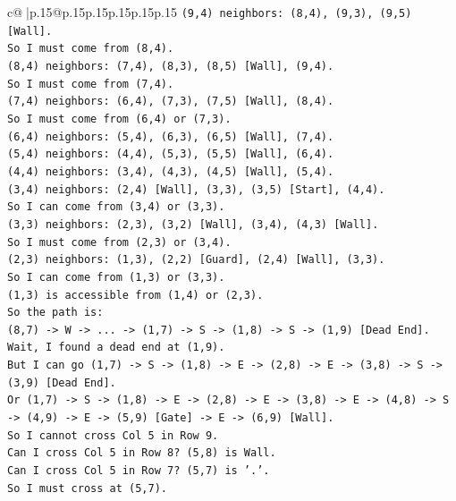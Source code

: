 \documentclass{article}
\begin{document}
{\begin{supertabular}{c@{$\;$}|p{.15\linewidth}@{}p{.15\linewidth}p{.15\linewidth}p{.15\linewidth}p{.15\linewidth}p{.15\linewidth}}
{{{\texttt{(9,4) neighbors: (8,4), (9,3), (9,5) {[}Wall{]}.} \\
\texttt{So I must come from (8,4).} \\
\texttt{(8,4) neighbors: (7,4), (8,3), (8,5) {[}Wall{]}, (9,4).} \\
\texttt{So I must come from (7,4).} \\
\texttt{(7,4) neighbors: (6,4), (7,3), (7,5) {[}Wall{]}, (8,4).} \\
\texttt{So I must come from (6,4) or (7,3).} \\
\texttt{(6,4) neighbors: (5,4), (6,3), (6,5) {[}Wall{]}, (7,4).} \\
\texttt{(5,4) neighbors: (4,4), (5,3), (5,5) {[}Wall{]}, (6,4).} \\
\texttt{(4,4) neighbors: (3,4), (4,3), (4,5) {[}Wall{]}, (5,4).} \\
\texttt{(3,4) neighbors: (2,4) {[}Wall{]}, (3,3), (3,5) {[}Start{]}, (4,4).} \\
\texttt{So I can come from (3,4) or (3,3).} \\
\texttt{(3,3) neighbors: (2,3), (3,2) {[}Wall{]}, (3,4), (4,3) {[}Wall{]}.} \\
\texttt{So I must come from (2,3) or (3,4).} \\
\texttt{(2,3) neighbors: (1,3), (2,2) {[}Guard{]}, (2,4) {[}Wall{]}, (3,3).} \\
\texttt{So I can come from (1,3) or (3,3).} \\
\texttt{(1,3) is accessible from (1,4) or (2,3).} \\
\texttt{So the path is:} \\
\texttt{(8,7) {-}> W {-}> ... {-}> (1,7) {-}> S {-}> (1,8) {-}> S {-}> (1,9) {[}Dead End{]}.} \\
\texttt{Wait, I found a dead end at (1,9).} \\
\texttt{But I can go (1,7) {-}> S {-}> (1,8) {-}> E {-}> (2,8) {-}> E {-}> (3,8) {-}> S {-}> (3,9) {[}Dead End{]}.} \\
\texttt{Or (1,7) {-}> S {-}> (1,8) {-}> E {-}> (2,8) {-}> E {-}> (3,8) {-}> E {-}> (4,8) {-}> S {-}> (4,9) {-}> E {-}> (5,9) {[}Gate{]} {-}> E {-}> (6,9) {[}Wall{]}.} \\
\texttt{So I cannot cross Col 5 in Row 9.} \\
\texttt{Can I cross Col 5 in Row 8? (5,8) is Wall.} \\
\texttt{Can I cross Col 5 in Row 7? (5,7) is '.'.} \\
\texttt{So I must cross at (5,7).} \\
}}}
\end{supertabular}}
\end{document}
